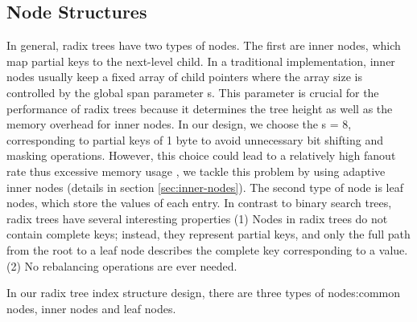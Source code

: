 \documentclass[sigplan,screen,nonacm]{acmart}
\begin{document}
\subsection{Node Structures}
In general, radix trees have two types of nodes. The first are inner nodes, which map partial keys to the next-level child. In a traditional implementation, inner nodes usually keep a fixed array of child pointers where the array size is controlled by the global span parameter s. This parameter is crucial for the performance of radix trees because it determines the tree height as well as the memory overhead for inner nodes. In our design, we choose the s = 8, corresponding to partial keys of 1 byte to avoid unnecessary bit shifting and masking operations. However, this choice could lead to a relatively high fanout rate thus excessive memory usage \cite{boehm2011efficient} , we tackle this problem by using adaptive inner nodes (details in section \ref{sec:inner-nodes}). The second type of node is leaf nodes, which store the values of each entry. In contrast to binary search trees, radix trees have several interesting properties (1) Nodes in radix trees do not contain complete keys; instead, they represent partial keys, and only the full path from the root to a leaf node describes the complete key corresponding to a value. (2) No rebalancing operations are ever needed. 

In our radix tree index structure design, there are three types of nodes:common nodes, inner nodes and leaf nodes. 
\end{document}
